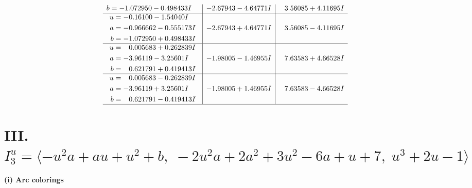 \documentclass[1p]{elsarticle_modified}
\theoremstyle{definition}
\begin{document}
$$\begin{array}{c|c|c}
\begin{aligned}
b &= -1.072950 - 0.498433 I\end{aligned}
 & -2.67943 - 4.64771 I & \phantom{-}3.56085 + 4.11695 I \\ \hline\begin{aligned}
u &= -0.16100 - 1.54040 I \\
a &= -0.966662 - 0.555173 I \\
b &= -1.072950 + 0.498433 I\end{aligned}
 & -2.67943 + 4.64771 I & \phantom{-}3.56085 - 4.11695 I \\ \hline\begin{aligned}
u &= \phantom{-}0.005683 + 0.262839 I \\
a &= -3.96119 - 3.25601 I \\
b &= \phantom{-}0.621791 + 0.419413 I\end{aligned}
 & -1.98005 - 1.46955 I & \phantom{-}7.63583 + 4.66528 I \\ \hline\begin{aligned}
u &= \phantom{-}0.005683 - 0.262839 I \\
a &= -3.96119 + 3.25601 I \\
b &= \phantom{-}0.621791 - 0.419413 I\end{aligned}
 & -1.98005 + 1.46955 I & \phantom{-}7.63583 - 4.66528 I\\
 \hline 
 \end{array}$$\newpage\newpage\renewcommand{\arraystretch}{1}
\centering \section*{III. $I^u_{3}= \langle - u^2 a+a u+u^2+b,\;-2 u^2 a+2 a^2+3 u^2-6 a+u+7,\;u^3+2 u-1 \rangle$}
\flushleft \textbf{(i) Arc colorings}\\
\end{document}

